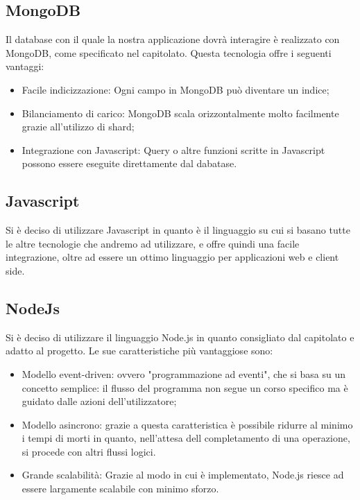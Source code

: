 \subsection{MongoDB}
Il database con il quale la nostra applicazione dovrà interagire è realizzato con MongoDB, come specificato nel capitolato. Questa tecnologia offre i seguenti vantaggi:
\begin{itemize}
\item Facile indicizzazione: Ogni campo in MongoDB può diventare un indice;
\item Bilanciamento di carico: MongoDB scala orizzontalmente molto facilmente grazie all'utilizzo di shard;
\item Integrazione con Javascript: Query o altre funzioni scritte in Javascript possono essere eseguite direttamente dal dabatase.
\end{itemize}

\subsection{Javascript}
Si è deciso di utilizzare Javascript in quanto è il linguaggio su cui si basano tutte le altre tecnologie che andremo ad utilizzare, e offre quindi una facile integrazione, oltre ad essere un ottimo linguaggio per applicazioni web e client side.


\subsection{NodeJs}
Si è deciso di utilizzare il linguaggio Node.js in quanto consigliato dal capitolato e adatto al progetto. Le sue caratteristiche più vantaggiose sono:
\begin{itemize}
\item Modello event-driven: ovvero "programmazione ad eventi", che si basa su un concetto semplice: il flusso del programma non segue un corso specifico ma è guidato dalle azioni dell'utilizzatore;
\item Modello asincrono: grazie a questa caratteristica è possibile ridurre al minimo i tempi di morti in quanto, nell'attesa dell completamento di una operazione, si procede con altri flussi logici. 
\item Grande scalabilità: Grazie al modo in cui è implementato, Node.js riesce ad essere largamente scalabile con minimo sforzo.
\end{itemize}


